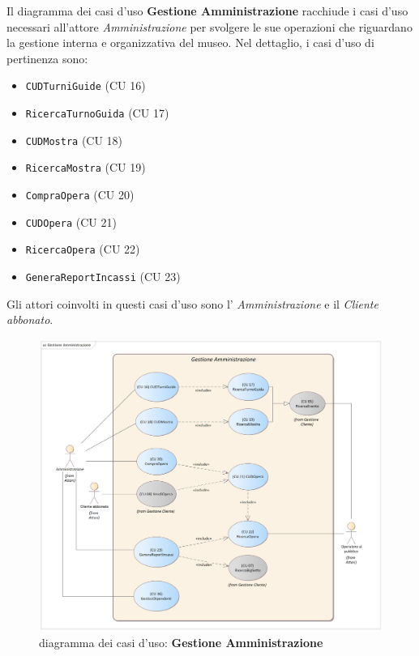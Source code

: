 \documentclass{article}
\begin{document}
\indent\indent Il diagramma dei casi d'uso \textbf{Gestione Amministrazione} racchiude i casi d'uso necessari all'attore \emph{Amministrazione} per svolgere le sue operazioni che riguardano la gestione interna e organizzativa del museo. Nel dettaglio, i casi d'uso di pertinenza sono:
\medskip
\begin{itemize}[itemsep=4pt]
  \item \texttt{CUDTurniGuide} (CU 16)
  \item \texttt{RicercaTurnoGuida} (CU 17)
  \item \texttt{CUDMostra} (CU 18)
  \item \texttt{RicercaMostra} (CU 19)
  \item \texttt{CompraOpera} (CU 20)
  \item \texttt{CUDOpera} (CU 21)
  \item \texttt{RicercaOpera} (CU 22)
  \item \texttt{GeneraReportIncassi} (CU 23)
\end{itemize}
\medskip
Gli attori coinvolti in questi casi d'uso sono l' \emph{Amministrazione} e il \emph{Cliente abbonato}.

\begin{figure}[h]
    \centering
    \includegraphics[width=1\textwidth]{Gestione Amministrazione}
    \caption{diagramma dei casi d'uso: \textbf{Gestione Amministrazione}}
    \label{fig:GestioneAmministrazione}
\end{figure}

\newpage
\end{document}
